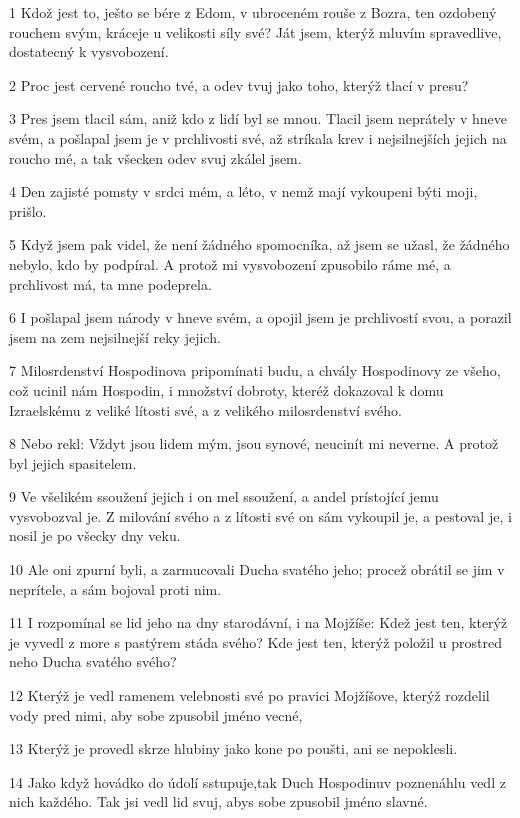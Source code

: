 \par 1 Kdož jest to, ješto se bére z Edom, v ubroceném rouše z Bozra, ten ozdobený rouchem svým, kráceje u velikosti síly své? Ját jsem, kterýž mluvím spravedlive, dostatecný k vysvobození.
\par 2 Proc jest cervené roucho tvé, a odev tvuj jako toho, kterýž tlací v presu?
\par 3 Pres jsem tlacil sám, aniž kdo z lidí byl se mnou. Tlacil jsem neprátely v hneve svém, a pošlapal jsem je v prchlivosti své, až stríkala krev i nejsilnejších jejich na roucho mé, a tak všecken odev svuj zkálel jsem.
\par 4 Den zajisté pomsty v srdci mém, a léto, v nemž mají vykoupeni býti moji, prišlo.
\par 5 Když jsem pak videl, že není žádného spomocníka, až jsem se užasl, že žádného nebylo, kdo by podpíral. A protož mi vysvobození zpusobilo ráme mé, a prchlivost má, ta mne podeprela.
\par 6 I pošlapal jsem národy v hneve svém, a opojil jsem je prchlivostí svou, a porazil jsem na zem nejsilnejší reky jejich.
\par 7 Milosrdenství Hospodinova pripomínati budu, a chvály Hospodinovy ze všeho, což ucinil nám Hospodin, i množství dobroty, kteréž dokazoval k domu Izraelskému z veliké lítosti své, a z velikého milosrdenství svého.
\par 8 Nebo rekl: Vždyt jsou lidem mým, jsou synové, neucinít mi neverne. A protož byl jejich spasitelem.
\par 9 Ve všelikém ssoužení jejich i on mel ssoužení, a andel prístojící jemu vysvobozval je. Z milování svého a z lítosti své on sám vykoupil je, a pestoval je, i nosil je po všecky dny veku.
\par 10 Ale oni zpurní byli, a zarmucovali Ducha svatého jeho; procež obrátil se jim v neprítele, a sám bojoval proti nim.
\par 11 I rozpomínal se lid jeho na dny starodávní, i na Mojžíše: Kdež jest ten, kterýž je vyvedl z more s pastýrem stáda svého? Kde jest ten, kterýž položil u prostred neho Ducha svatého svého?
\par 12 Kterýž je vedl ramenem velebnosti své po pravici Mojžíšove, kterýž rozdelil vody pred nimi, aby sobe zpusobil jméno vecné,
\par 13 Kterýž je provedl skrze hlubiny jako kone po poušti, ani se nepoklesli.
\par 14 Jako když hovádko do údolí sstupuje,tak Duch Hospodinuv poznenáhlu vedl z nich každého. Tak jsi vedl lid svuj, abys sobe zpusobil jméno slavné.
